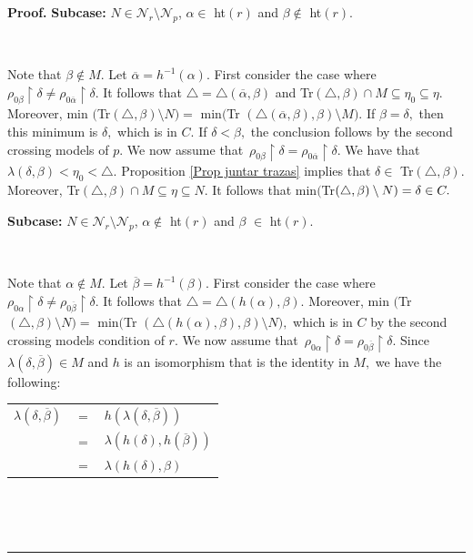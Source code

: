 \documentclass{article}
\newenvironment{proof}[1][Proof]{\noindent\textbf{#1.} }{\ \rule{0.5em}{0.5em}}
\begin{document}
\begin{proof}
\textbf{Subcase: }$N\in\mathcal{N}_{r}\setminus\mathcal{N}_{p}$, $\alpha\in$
\textsf{ht}$\left(  r\right)  $ and $\beta\notin$ \textsf{ht}$\left(
r\right)  .$

\qquad\ \ 

Note that $\beta\notin M.$ Let $\overline{\alpha}=h^{-1}\left(  \alpha\right)
.$ First consider the case where $\rho_{0\beta}\upharpoonright\delta\neq
\rho_{0\overline{\alpha}}\upharpoonright\delta.$ It follows that
$\triangle=\triangle(\overline{\alpha},\beta)$ and \textsf{Tr}$(\triangle
,\beta)\cap M\subseteq\eta_{0}\subseteq\eta.$ Moreover, \textsf{min}%
$($\textsf{Tr}$(\triangle,\beta)\setminus N)=$ \textsf{min}$($\textsf{Tr}%
$(\triangle\left(  \overline{\alpha},\beta\right)  ,\beta)\setminus M).$ If
$\beta=\delta,$ then this minimum is $\delta,$ which is in $C.$ If
$\delta<\beta,$ the conclusion follows by the second crossing models of $p.$
We now assume that\ $\rho_{0\beta}\upharpoonright\delta=\rho_{0\overline
{\alpha}}\upharpoonright\delta.$ We have that $\lambda\left(  \delta
,\beta\right)  <\eta_{0}<\triangle.$ Proposition \ref{Prop juntar trazas}
implies that $\delta\in$ \textsf{Tr}$(\triangle,\beta).$ Moreover,
\newline\textsf{Tr}$(\triangle,\beta)\cap M\subseteq\eta\subseteq N.$ It
follows that \textsf{min}$($\textsf{Tr}$(\triangle,\beta)\setminus
N)=\delta\in C.\medskip$

\textbf{Subcase: }$N\in\mathcal{N}_{r}\setminus\mathcal{N}_{p}$, $\alpha
\notin$ \textsf{ht}$\left(  r\right)  $ and $\beta$ $\in$ \textsf{ht}$\left(
r\right)  .$

\qquad\ \ \ \qquad\ \qquad\ \ 

Note that $\alpha\notin M.$ Let $\overline{\beta}=h^{-1}\left(  \beta\right)
.$ First consider the case where $\rho_{0\alpha}\upharpoonright\delta\neq
\rho_{0\overline{\beta}}\upharpoonright\delta.$ It follows that $\triangle
=\triangle(h\left(  \alpha\right)  ,\beta).$ Moreover, \textsf{min}%
$($\textsf{Tr}$(\triangle,\beta)\setminus N)=$ \textsf{min}$($\textsf{Tr}%
$(\triangle\left(  h\left(  \alpha\right)  ,\beta\right)  ,\beta)\setminus
N),$ which is in $C$ by the second crossing models condition of $r.$ We now
assume that\ $\rho_{0\alpha}\upharpoonright\delta=\rho_{0\overline{\beta}%
}\upharpoonright\delta.$ Since $\lambda(\delta,\overline{\beta})\in M$ and $h$
is an isomorphism that is the identity in $M,$ we have the following:\newline

\hfill%
\begin{tabular}
[c]{lll}%
$\lambda(\delta,\overline{\beta})$ & $=$ & $h(\lambda(\delta,\overline{\beta
}))$\\
& $=$ & $\lambda(h\left(  \delta\right)  ,h(\overline{\beta}))$\\
& $=$ & $\lambda(h\left(  \delta\right)  ,\beta)$%
\end{tabular}
\hfill\ 


\end{proof}
\end{document}
